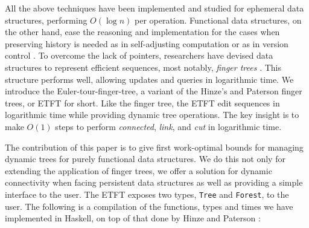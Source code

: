 All the above techniques have been implemented and studied for ephemeral data structures, performing $O(\log n)$ per operation. Functional data structures, on the other hand, ease the reasoning and implementation for the cases when preserving history is needed as in self-adjusting computation \cite{DynamizingAlgos} or as in version control \cite{CVS-Demaine}. To overcome the lack of pointers, researchers have devised data structures to represent efficient sequences, most notably, \textit{finger trees} \cite{FTs}. This structure performs well, allowing updates and queries in logarithmic time. We introduce the Euler-tour-finger-tree, a variant of the Hinze's and Paterson finger trees, or ETFT for short. Like the finger tree, the ETFT edit sequences in logarithmic time while providing dynamic tree operations. The key insight is to make $O(1)$ steps to perform \textit{connected}, \textit{link}, and \textit{cut} in logarithmic time. 

The contribution of this paper is to give first work-optimal bounds for managing dynamic trees for purely functional data structures. We do this not only for extending the application of finger trees, we offer a solution for dynamic connectivity when facing persistent data structures as well as providing a simple interface to the user. The ETFT exposes two types, \texttt{Tree} and \texttt{Forest}, to the user. The following is a compilation of  the functions, types and times we have implemented in Haskell, on top of that done by Hinze and Paterson \cite{FTs}:

